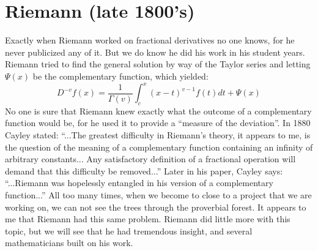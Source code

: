 \documentclass[a4paper,14pt,oneside]{book}
\theoremstyle{plain}
\theoremstyle{definition}
\theoremstyle{remark}
\begin{document}
\section{Riemann (late 1800's)}
\begin{center} 

         \begin{flushleft} 
         \justify
         \Large{
\par{Exactly when Riemann worked on fractional derivatives no one knows, for he never publicized any of it. But we do know he did his work in his student years. Riemann tried to find the general solution by way of the Taylor series and letting $\Psi(x)$ be the complementary function, which yielded:
\begin{equation}\label{eq:3}
D^{-v} f(x)=\frac{1}{\Gamma(v)} \int_{c}^{x}(x-t)^{v-1} f(t)dt+\Psi(x)
\end{equation}
No one is sure that Riemann knew exactly what the outcome of a complementary function would be, for he used it to provide a \textquotedblleft measure of the deviation\textquotedblright. In 1880 Cayley \cite{bb8} stated: \enquote{...The greatest difficulty in Riemann's theory, it appears to me, is the question of the meaning of a complementary function containing an infinity of arbitrary constants... Any satisfactory definition of a fractional operation will demand that this difficulty be removed...} Later in his paper, Cayley says: \enquote{...Riemann was hopelessly entangled in his version of a complementary function...} All too many times, when we become to close to a project that we are working on, we can not see the trees through the proverbial forest. It appears to me that Riemann had this same problem. Riemann did little more with this topic, but we will see that he had tremendous insight, and several mathematicians built on his work.}}
\end{flushleft}        
\end{center}
\end{document}
